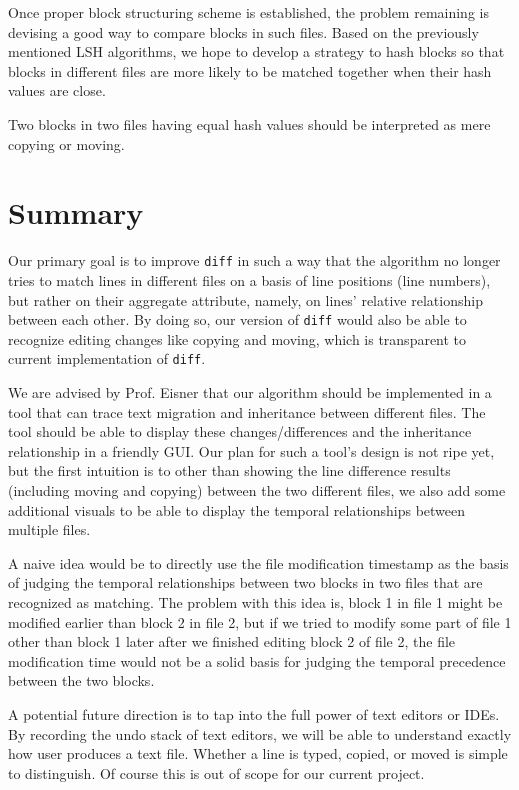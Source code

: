 \documentclass{article}
\begin{document}
Once proper block structuring scheme is established, the problem remaining is devising a good way to compare blocks in such files.
Based on the previously mentioned LSH algorithms, we hope to develop a strategy to hash blocks so that blocks in different files are more likely to be matched together when their hash values are close.

Two blocks in two files having equal hash values should be interpreted as mere copying or moving. 

\section{Summary}
Our primary goal is to improve \texttt{diff} in such a way that the algorithm no longer tries to match lines in different files on a basis of line positions (line numbers), but rather on their aggregate attribute, namely, on lines' relative relationship between each other. By doing so, our version of \texttt{diff} would also be able to recognize editing changes like copying and moving, which is transparent to current implementation of \texttt{diff}.

We are advised by Prof. Eisner that our algorithm should be implemented in a tool that can trace text migration and inheritance between different files. The tool should be able to display these changes/differences and the inheritance relationship in a friendly GUI. Our plan for such a tool's design is not ripe yet, but the first intuition is to other than showing the line difference results (including moving and copying) between the two different files, we also add some additional visuals to be able to display the temporal relationships between multiple files. 

A naive idea would be to directly use the file modification timestamp as the basis of judging the temporal relationships between two blocks in two files that are recognized as matching.
The problem with this idea is, block 1 in file 1 might be modified earlier than block 2 in file 2, but if we tried to modify some part of file 1 other than block 1 later after we finished editing block 2 of file 2, the file modification time would not be a solid basis for judging the temporal precedence between the two blocks.

A potential future direction is to tap into the full power of text editors or IDEs. By recording the undo stack of text editors, we will be able to understand exactly how user produces a text file. Whether a line is typed, copied, or moved is simple to distinguish. Of course this is out of scope for our current project.
\end{document}
